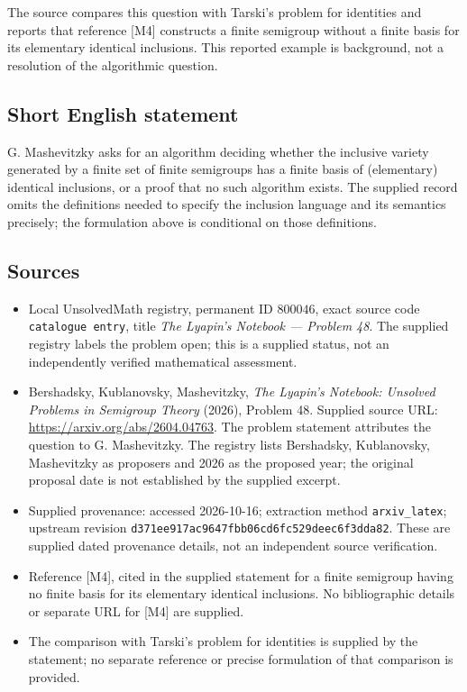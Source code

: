 \documentclass[11pt]{article}
\begin{document}
The source compares this question with Tarski's problem for identities and reports that reference [M4] constructs a finite semigroup without a finite basis for its elementary identical inclusions. This reported example is background, not a resolution of the algorithmic question.
\subsection{Short English statement}
G. Mashevitzky asks for an algorithm deciding whether the inclusive variety generated by a finite set of finite semigroups has a finite basis of (elementary) identical inclusions, or a proof that no such algorithm exists. The supplied record omits the definitions needed to specify the inclusion language and its semantics precisely; the formulation above is conditional on those definitions.
\subsection{Sources}
\begin{itemize}
\item Local UnsolvedMath registry, permanent ID \(800046\), exact source code \texttt{catalogue entry}, title \emph{The Lyapin's Notebook --- Problem 48}. The supplied registry labels the problem open; this is a supplied status, not an independently verified mathematical assessment.
\item Bershadsky, Kublanovsky, Mashevitzky, \emph{The Lyapin's Notebook: Unsolved Problems in Semigroup Theory} (2026), Problem 48. Supplied source URL: \url{https://arxiv.org/abs/2604.04763}. The problem statement attributes the question to G. Mashevitzky. The registry lists Bershadsky, Kublanovsky, Mashevitzky as proposers and 2026 as the proposed year; the original proposal date is not established by the supplied excerpt.
\item Supplied provenance: accessed 2026-10-16; extraction method \texttt{arxiv\_latex}; upstream revision \texttt{d371ee917ac9647fbb06cd6fc529deec6f3dda82}. These are supplied dated provenance details, not an independent source verification.
\item Reference [M4], cited in the supplied statement for a finite semigroup having no finite basis for its elementary identical inclusions. No bibliographic details or separate URL for [M4] are supplied.
\item The comparison with Tarski's problem for identities is supplied by the statement; no separate reference or precise formulation of that comparison is provided.
\end{itemize}
\end{document}
